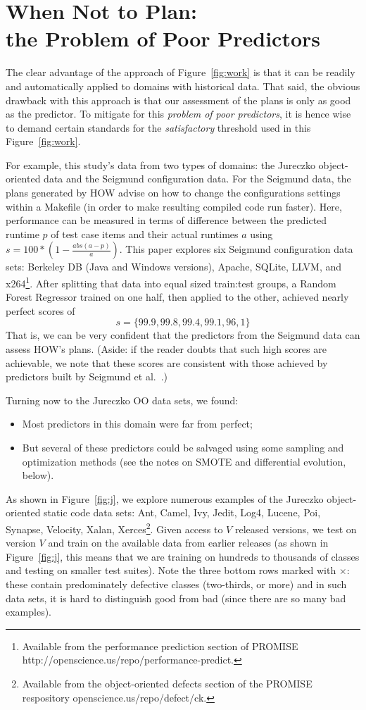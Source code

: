 \documentclass[conference]{IEEEtran}
\newcommand{\bi}{\begin{itemize}}
\newcommand{\ei}{\end{itemize}}
\newcommand{\fig}[1]{Figure~\ref{fig:#1}}
\begin{document}
\section{When Not to Plan: \\the Problem of Poor Predictors}

The clear advantage of the approach of \fig{work} is that it can be readily and automatically
applied to domains with historical data. That said, the obvious drawback with this approach
is that our assessment of the plans is only as good as the predictor. To 
mitigate for this {\em problem of poor predictors}, it is hence wise to demand certain standards for the {\em
satisfactory} threshold used in this \fig{work}. 
 

For example, this study's data from two types of domains: the Jureczko   object-oriented data  
and the Seigmund configuration data. 
For the Seigmund data, the plans generated by HOW advise on how  to change the   configurations settings within a Makefile
(in order to make resulting compiled
code  run faster). Here, performance can be measured in terms of  difference
between the predicted runtime $p$ of test case items and their actual runtimes $a$
using  $s= 100*(1- \frac{abs(a - p)}{a})$.
This paper  explores    six Seigmund configuration data sets:  Berkeley DB (Java and Windows versions), Apache, SQLite, LLVM, and
  x264\footnote{Available from the performance prediction section of PROMISE
  http://openscience.us/repo/performance-predict.}. 
  After splitting that data into equal sized train:test groups, a Random Forest
  Regressor trained on one half, then applied to the other, achieved nearly perfect scores of
\[s=\{99.9, 99.8, 99.4, 99.1, 96,1\}\]
That is, we can be very confident that the predictors from the Seigmund data can assess
HOW's plans.
(Aside: if the reader doubts that such high scores are achievable, we note that these scores are 
consistent with those achieved by predictors built by Seigmund et al.~\cite{sven12}.)

Turning now to the Jureczko   OO data sets, we found:
\bi
\item
Most   predictors in this domain were far from      perfect;
\item 
But several of these predictors could
be salvaged using some sampling and optimization methods (see the notes on SMOTE and differential evolution, below).
\ei
As shown in \fig{j}, we   explore numerous examples of the Jureczko   object-oriented static code data sets: Ant, Camel, Ivy, Jedit,   Log4, Lucene, Poi, Synapse, Velocity, Xalan, Xerces\footnote{Available from the object-oriented defects section of the PROMISE respository openscience.us/repo/defect/ck.}. 
Given access to $V$ released
versions, we test on version $V$ and train on the available data from earlier releases (as
shown in \fig{j}, this means that we are training on hundreds to thousands
of classes and testing on smaller test suites).
Note the three bottom rows marked with $\times$: these contain predominately
defective classes (two-thirds, or more) and in such data sets, it is hard to distinguish
good from bad (since there are so many bad examples). 
\end{document}
